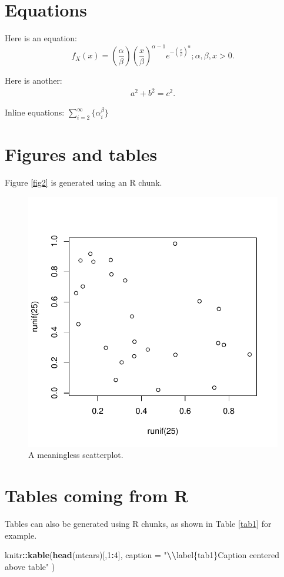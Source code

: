 \documentclass[preprint, 3p,
authoryear]{elsarticle} %
\newenvironment{Shaded}{\begin{snugshade}}{\end{snugshade}}
\newcommand{\AttributeTok}[1]{\textcolor[rgb]{0.13,0.29,0.53}{#1}}
\newcommand{\DecValTok}[1]{\textcolor[rgb]{0.00,0.00,0.81}{#1}}
\newcommand{\FunctionTok}[1]{\textcolor[rgb]{0.13,0.29,0.53}{\textbf{#1}}}
\newcommand{\NormalTok}[1]{#1}
\newcommand{\SpecialCharTok}[1]{\textcolor[rgb]{0.81,0.36,0.00}{\textbf{#1}}}
\newcommand{\StringTok}[1]{\textcolor[rgb]{0.31,0.60,0.02}{#1}}
\begin{document}
\section{Equations}\label{equations}

Here is an equation: \[ 
  f_{X}(x) = \left(\frac{\alpha}{\beta}\right)
  \left(\frac{x}{\beta}\right)^{\alpha-1}
  e^{-\left(\frac{x}{\beta}\right)^{\alpha}}; 
  \alpha,\beta,x > 0 .
\]

Here is another: \begin{align}
  a^2+b^2=c^2.
\end{align}

Inline equations: \(\sum_{i = 2}^\infty\{\alpha_i^\beta\}\)

\section{Figures and tables}\label{figures-and-tables}

Figure \ref{fig2} is generated using an R chunk.

\begin{figure}

{\centering \includegraphics[width=0.5\linewidth]{testrticles_files/figure-latex/fig2-1} 

}

\caption{\label{fig2}A meaningless scatterplot.}\label{fig:fig2}
\end{figure}

\section{Tables coming from R}\label{tables-coming-from-r}

Tables can also be generated using R chunks, as shown in Table
\ref{tab1} for example.

\begin{Shaded}
\begin{Highlighting}[]
\NormalTok{knitr}\SpecialCharTok{::}\FunctionTok{kable}\NormalTok{(}\FunctionTok{head}\NormalTok{(mtcars)[,}\DecValTok{1}\SpecialCharTok{:}\DecValTok{4}\NormalTok{], }
    \AttributeTok{caption =} \StringTok{"}\SpecialCharTok{\textbackslash{}\textbackslash{}}\StringTok{label\{tab1\}Caption centered above table"}
\NormalTok{)}
\end{Highlighting}
\end{Shaded}
\end{document}
